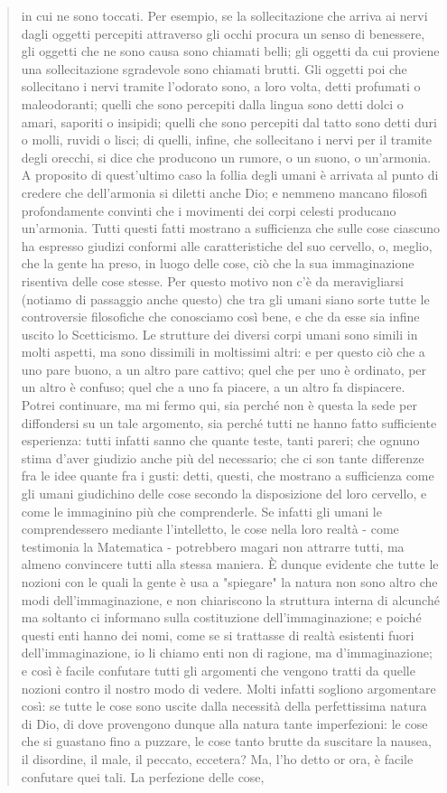 \begin{quotation}
	in cui ne sono toccati. Per esempio, se la sollecitazione che arriva ai nervi dagli oggetti percepiti attraverso gli occhi procura un senso di benessere, gli oggetti che ne sono causa sono
	chiamati belli; gli oggetti da cui proviene una sollecitazione sgradevole sono chiamati brutti. Gli oggetti poi che sollecitano i nervi tramite l’odorato sono, a loro volta, detti profumati
	o maleodoranti; quelli che sono percepiti dalla lingua sono detti dolci o amari, saporiti o insipidi; quelli che sono percepiti dal tatto sono detti duri o molli, ruvidi o lisci; di quelli, infine, che sollecitano i nervi per il tramite degli orecchi, si dice che producono un rumore, o
	un suono, o un’armonia. A proposito di quest’ultimo caso la follia degli umani è arrivata al
	punto di credere che dell’armonia si diletti anche Dio; e nemmeno mancano filosofi profondamente convinti che i movimenti dei corpi celesti producano un’armonia. Tutti questi fatti mostrano a sufficienza che sulle cose ciascuno ha espresso giudizi conformi alle caratteristiche del suo cervello, o, meglio, che la gente ha preso, in luogo delle cose, ciò che la sua
	immaginazione risentiva delle cose stesse. Per questo motivo non c’è da meravigliarsi (notiamo di passaggio anche questo) che tra gli umani siano sorte tutte le controversie filosofiche che conosciamo così bene, e che da esse sia infine uscito lo Scetticismo. Le strutture dei diversi corpi umani sono simili in molti aspetti, ma sono dissimili in moltissimi altri: e per questo ciò che a uno pare buono, a un altro pare cattivo; quel che per uno è
	ordinato, per un altro è confuso; quel che a uno fa piacere, a un altro fa dispiacere. Potrei
	continuare, ma mi fermo qui, sia perché non è questa la sede per diffondersi su un tale argomento, sia perché tutti ne hanno fatto sufficiente esperienza: tutti infatti sanno che
	quante teste, tanti pareri; che ognuno stima d’aver giudizio anche più del necessario; che
	ci son tante differenze fra le idee quante fra i gusti: detti, questi, che mostrano a sufficienza come gli umani giudichino delle cose secondo la disposizione del loro cervello, e come le
	immaginino più che comprenderle. Se infatti gli umani le comprendessero mediante l’intelletto, le cose nella loro realtà - come testimonia la Matematica - potrebbero magari non
	attrarre tutti, ma almeno convincere tutti alla stessa maniera.
	È dunque evidente che tutte le nozioni con le quali la gente è usa a "spiegare" la natura
	non sono altro che modi dell’immaginazione, e non chiariscono la struttura interna di alcunché ma soltanto ci informano sulla costituzione dell’immaginazione; e poiché questi enti hanno dei nomi, come se si trattasse di realtà esistenti fuori dell’immaginazione, io li chiamo enti non di ragione, ma d’immaginazione; e così è facile confutare tutti gli argomenti che vengono tratti da quelle nozioni contro il nostro modo di vedere. Molti infatti sogliono argomentare così: se tutte le cose sono uscite dalla necessità della perfettissima natura di Dio, di dove provengono dunque alla natura tante imperfezioni: le cose che si guastano fino a puzzare, le cose tanto brutte da suscitare la nausea, il disordine, il male, il peccato, eccetera? Ma, l’ho detto or ora, è facile confutare quei tali. La perfezione delle cose,

\end{quotation}
